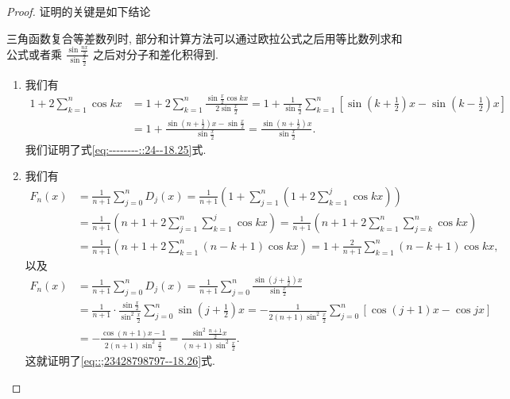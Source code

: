 \documentclass[../../main.tex]{subfiles}
\begin{document}
\begin{proof}
证明的关键是如下结论
\begin{conclusion}
三角函数复合等差数列时, 部分和计算方法可以通过欧拉公式之后用等比数列求和公式或者乘 $\frac{\sin \frac{nx}{2}}{\sin \frac{x}{2}}$ 之后对分子和差化积得到.
\end{conclusion}
\begin{enumerate}
\item 我们有
\begin{align*}
1 + 2\sum_{k = 1}^{n} \cos kx &= 1 + 2\sum_{k = 1}^{n} \frac{\sin \frac{x}{2} \cos kx}{2\sin \frac{x}{2}} = 1 + \frac{1}{\sin \frac{x}{2}} \sum_{k = 1}^{n} [\sin\left(k + \frac{1}{2}\right)x - \sin\left(k - \frac{1}{2}\right)x] \\
&= 1 + \frac{\sin\left(n + \frac{1}{2}\right)x - \sin \frac{x}{2}}{\sin \frac{x}{2}} = \frac{\sin\left(n + \frac{1}{2}\right)x}{\sin \frac{x}{2}}.
\end{align*}
我们证明了式\eqref{eq:--------::24--18.25}式.

\item 我们有
\begin{align*}
F_n(x) &= \frac{1}{n + 1}\sum_{j = 0}^{n} D_j(x) = \frac{1}{n + 1} \left( 1 + \sum_{j = 1}^{n} \left(1 + 2\sum_{k = 1}^{j} \cos kx \right) \right) \\
&= \frac{1}{n + 1} \left( n + 1 + 2\sum_{j = 1}^{n} \sum_{k = 1}^{j} \cos kx \right) = \frac{1}{n + 1} \left( n + 1 + 2\sum_{k = 1}^{n} \sum_{j = k}^{n} \cos kx \right) \\
&= \frac{1}{n + 1} \left( n + 1 + 2\sum_{k = 1}^{n} (n - k + 1)\cos kx \right) = 1 + \frac{2}{n + 1}\sum_{k = 1}^{n} (n - k + 1)\cos kx,
\end{align*}
以及
\begin{align*}
F_n(x) &= \frac{1}{n + 1}\sum_{j = 0}^{n} D_j(x) = \frac{1}{n + 1}\sum_{j = 0}^{n} \frac{\sin\left(j + \frac{1}{2}\right)x}{\sin \frac{x}{2}} \\
&= \frac{1}{n + 1} \cdot \frac{\sin \frac{x}{2}}{\sin^2 \frac{x}{2}} \sum_{j = 0}^{n} \sin\left(j + \frac{1}{2}\right)x = -\frac{1}{2(n + 1)\sin^2 \frac{x}{2}} \sum_{j = 0}^{n} [\cos(j + 1)x - \cos jx] \\
&= -\frac{\cos(n + 1)x - 1}{2(n + 1)\sin^2 \frac{x}{2}} = \frac{\sin^2 \frac{n + 1}{2}x}{(n + 1)\sin^2 \frac{x}{2}}.
\end{align*}
这就证明了\eqref{eq::;23428798797--18.26}式.
\end{enumerate}
\end{proof}
\end{document}
